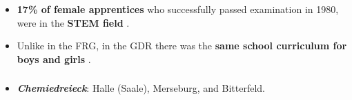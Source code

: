 \documentclass[11pt, aspectratio=1610, xcolor={dvipsnames}]{beamer}
\newcommand{\highlight}[1]{\textbf{\textcolor{PineGreen}{#1}}}
\newcommand{\todo}[1]{\textbf{\textcolor{red}{#1}}}
\begin{document}
	\begin{frame}
		\frametitle{}
		
		\begin{itemize}
			\item \highlight{17\% of female apprentices} who successfully passed examination in 1980, were in the \highlight{STEM field} \textcolor{darkgray}{\citep[p. 293]{DDRJahrbuch1981}}.
			\item Unlike in the FRG, in the GDR there was the \highlight{same school curriculum for boys and girls} \textcolor{darkgray}{\citep{FuchsSchuendeln2016, Lippmann2018}}.
		\end{itemize}
		
	\end{frame}
	

	
	\begin{frame}
		\frametitle{}
		
		\begin{itemize}
			\item \highlight{\emph{Chemiedreieck}}: Halle (Saale), Merseburg, and Bitterfeld.
		\end{itemize}
		
	\end{frame}
	
\end{document}
